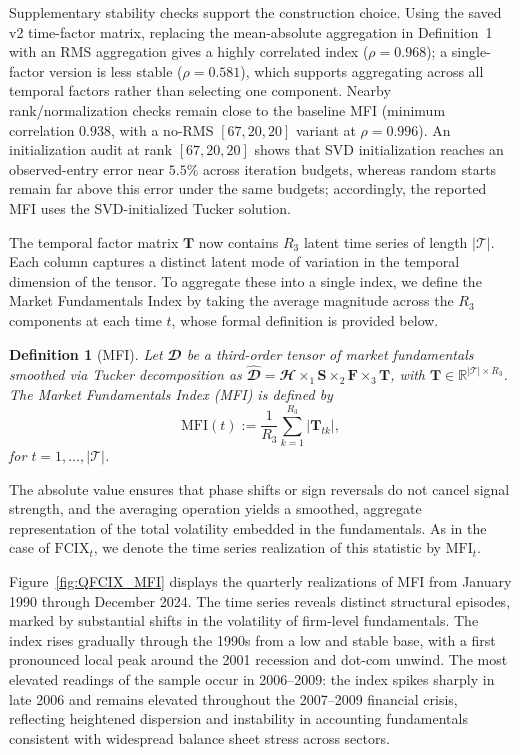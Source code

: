 \documentclass[pdflatex,sn-mathphys-num]{sn-jnl}%
\theoremstyle{thmstyleone}%
\theoremstyle{thmstyletwo}%
\theoremstyle{thmstylethree}%
\newtheorem{definition}{Definition}%
\begin{document}
Supplementary stability checks support the construction choice. Using the saved v2 time-factor matrix, replacing the mean-absolute aggregation in Definition~1 with an RMS aggregation gives a highly correlated index ($\rho=0.968$); a single-factor version is less stable ($\rho=0.581$), which supports aggregating across all temporal factors rather than selecting one component. Nearby rank/normalization checks remain close to the baseline MFI (minimum correlation $0.938$, with a no-RMS $[67,20,20]$ variant at $\rho=0.996$). An initialization audit at rank $[67,20,20]$ shows that SVD initialization reaches an observed-entry error near $5.5\%$ across iteration budgets, whereas random starts remain far above this error under the same budgets; accordingly, the reported MFI uses the SVD-initialized Tucker solution.

The temporal factor matrix $\mathbf{T}$ now contains $R_3$ latent time series of length $|\mathcal{T}|$. Each column captures a distinct latent mode of variation in the temporal dimension of the tensor. To aggregate these into a single index, we define the Market Fundamentals Index by taking the average magnitude across the $R_3$ components at each time $t$, whose formal definition is provided below.\newline

\begin{definition}[MFI]
	Let $\mathbfcal{D}$ be a third-order tensor of market fundamentals smoothed via Tucker decomposition as $\widehat{\mathbfcal{D}} = \mathbfcal{H} \times_1 \mathbf{S} \times_2 \mathbf{F} \times_3 \mathbf{T}$, with $\mathbf{T} \in \mathbb{R}^{|\mathcal{T}| \times R_3}$. The Market Fundamentals Index (MFI) is defined by
	\begin{equation}
		\mathrm{MFI}(t) := \frac{1}{R_3} \sum_{k=1}^{R_3} \left| \mathbf{T}_{t k} \right|,
	\end{equation}
	for $t = 1, \ldots, |\mathcal{T}|$.\newline
\end{definition}

The absolute value ensures that phase shifts or sign reversals do not cancel signal strength, and the averaging operation yields a smoothed, aggregate representation of the total volatility embedded in the fundamentals. As in the case of $\mathrm{FCIX}_t$, we denote the time series realization of this statistic by $\mathrm{MFI}_t$.

Figure~\ref{fig:QFCIX_MFI} displays the quarterly realizations of MFI from January 1990 through December 2024. The time series reveals distinct structural episodes, marked by substantial shifts in the volatility of firm-level fundamentals. The index rises gradually through the 1990s from a low and stable base, with a first pronounced local peak around the 2001 recession and dot-com unwind. The most elevated readings of the sample occur in 2006--2009: the index spikes sharply in late 2006 and remains elevated throughout the 2007--2009 financial crisis, reflecting heightened dispersion and instability in accounting fundamentals consistent with widespread balance sheet stress across sectors.
\end{document}

